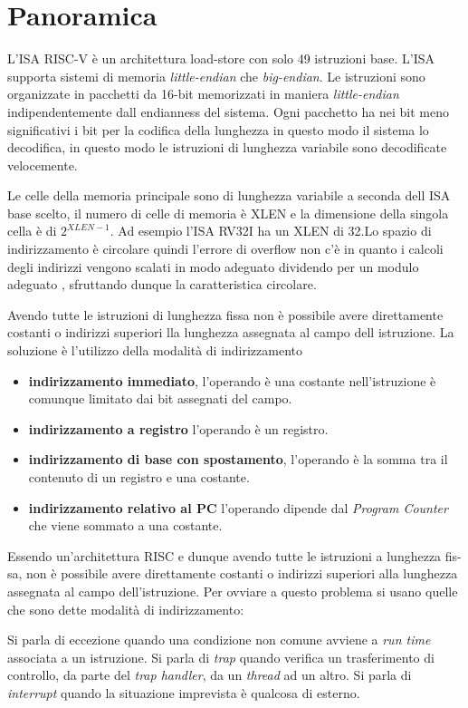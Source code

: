 \documentclass[12pt,a4paper]{report}
\begin{document}
\section{Panoramica}
L'ISA RISC-V è un architettura load-store con solo 49 istruzioni base. L'ISA supporta sistemi di memoria \textit{little-endian} che \textit{big-endian}. Le istruzioni sono organizzate in pacchetti da 16-bit memorizzati in maniera \textit{little-endian} indipendentemente dall endianness del sistema.  Ogni pacchetto ha nei bit meno significativi i bit per la codifica della lunghezza in questo modo il sistema lo decodifica, in questo modo le istruzioni di lunghezza variabile sono decodificate velocemente.

Le celle della memoria principale sono di lunghezza variabile a seconda dell ISA base scelto, il numero di celle di memoria è XLEN e la dimensione della singola cella è di $2^{XLEN - 1}$. Ad esempio l'ISA RV32I ha un XLEN di 32.Lo spazio di indirizzamento è circolare quindi l'errore di overflow non c'è in quanto i calcoli degli indirizzi vengono scalati in modo adeguato dividendo per un modulo adeguato , sfruttando dunque la caratteristica circolare.

Avendo tutte le istruzioni di lunghezza fissa non è possibile avere direttamente costanti o indirizzi superiori lla lunghezza assegnata al campo dell istruzione. La soluzione è l'utilizzo della modalità di indirizzamento
\begin{itemize}
	\item \textbf{indirizzamento immediato}, l’operando è una costante nell’istruzione è comunque limitato dai bit assegnati del campo.
	\item \textbf{indirizzamento a registro} l’operando è un registro.
	\item \textbf{indirizzamento di base con spostamento}, l’operando è la somma tra il
contenuto di un registro e una costante.
\item \textbf{indirizzamento relativo al PC} l'operando dipende dal \textit{Program Counter} che viene sommato a una costante.
\end{itemize}

Essendo un’architettura RISC e dunque avendo tutte le istruzioni a lunghezza fis- sa, non è possibile avere direttamente costanti o indirizzi superiori alla lunghezza assegnata al campo dell’istruzione. Per ovviare a questo problema si usano quelle che sono dette modalità di indirizzamento:

Si parla di eccezione quando una condizione non comune avviene a \textit{run time} associata a un istruzione.
Si parla di \textit{trap} quando verifica un trasferimento di controllo, da parte del \textit{trap handler}, da un  \textit{thread} ad un altro. Si parla di \textit{interrupt} quando la situazione imprevista è qualcosa di esterno.
\end{document}
